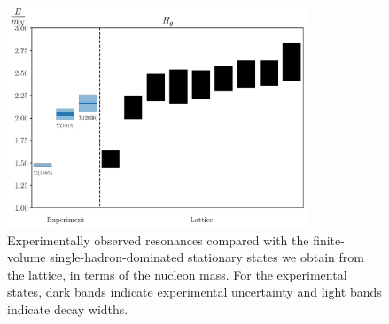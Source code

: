 \begin{figure}[H]
    \centering
    \includegraphics[width=0.8\textwidth]{figures/sigmas/hg/expvslat.pdf}
    \caption[Experimentally observed resonances compared with the finite-volume single-hadron-dominated stationary states we obtain from the lattice in $H_g$, in terms of the nucleon mass.]{Experimentally observed resonances compared with the finite-volume single-hadron-dominated stationary states we obtain from the lattice, in terms of the nucleon mass. For the experimental states, dark bands indicate experimental uncertainty and light bands indicate decay widths.}\label{fig:hg_exp}
\end{figure}

